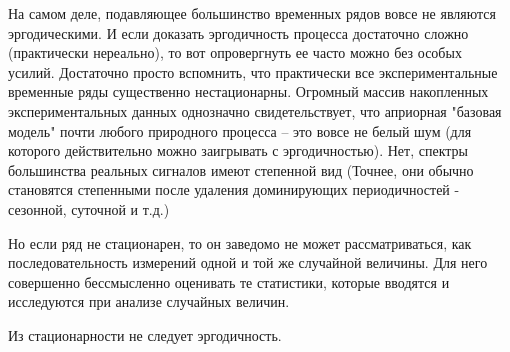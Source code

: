 На самом деле, подавляющее большинство временных рядов вовсе
не являются эргодическими. И если доказать эргодичность процесса
достаточно сложно (практически нереально), то вот
опровергнуть ее часто можно без особых усилий. Достаточно просто
вспомнить, что практически все экспериментальные временные ряды
существенно нестационарны. Огромный массив накопленных
экспериментальных данных однозначно свидетельствует, что априорная
"базовая модель" почти любого природного процесса – это вовсе не
белый шум (для которого действительно можно заигрывать с
эргодичностью). Нет, спектры большинства реальных сигналов имеют
степенной вид (Точнее, они обычно становятся степенными после
удаления доминирующих периодичностей - сезонной, суточной и т.д.)

Но если ряд не стационарен, то он заведомо не может
рассматриваться, как последовательность измерений одной и той же
случайной величины. Для него совершенно бессмысленно оценивать те
статистики, которые вводятся и исследуются при анализе случайных величин.

Из стационарности не следует эргодичность.


